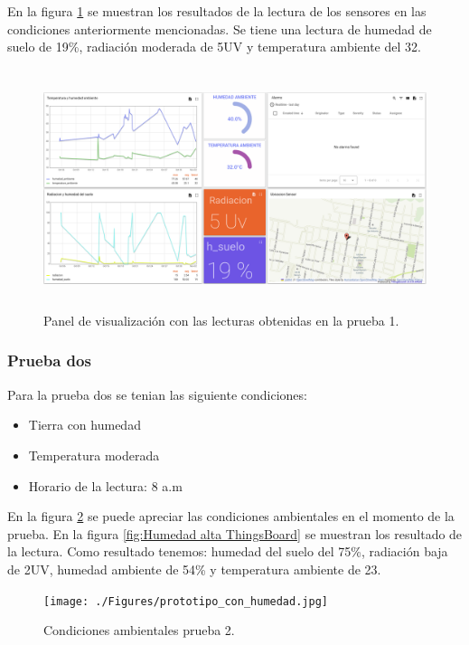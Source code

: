 En la figura \ref{fig:Lectura tierra seca tb} se muestran los resultados de la lectura de los sensores en las condiciones anteriormente mencionadas. Se tiene una lectura de humedad de suelo de 19\%, radiación moderada de 5UV y temperatura ambiente del 32\textcelsius.

\begin{figure}[h!]
  \centering
    \includegraphics[width=\linewidth, height=7cm]{./Figures/tb_prueba1.png}
  \caption{Panel de visualización con las lecturas obtenidas en la prueba 1.}
    \label{fig:Lectura tierra seca tb}
\end{figure}

\subsubsection{Prueba dos}
Para la prueba dos se tenian las siguiente condiciones:
\begin{itemize}
  \item Tierra con humedad
  \item Temperatura moderada
  \item Horario de la lectura: 8 a.m
\end{itemize}
En la figura \ref{fig:Humedad en el suelo} se puede apreciar las condiciones ambientales en el momento de la prueba.
En la figura \ref{fig:Humedad alta ThingsBoard} se muestran los resultado de la lectura. Como resultado tenemos: humedad del suelo del 75\%, radiación baja de 2UV, humedad ambiente de 54\% y temperatura ambiente de 23\textcelsius.

\begin{figure}[h!]
  \centering
    \texttt{[image: ./Figures/prototipo\_con\_humedad.jpg]}
  \caption{Condiciones ambientales prueba 2.}
    \label{fig:Humedad en el suelo}
\end{figure}

